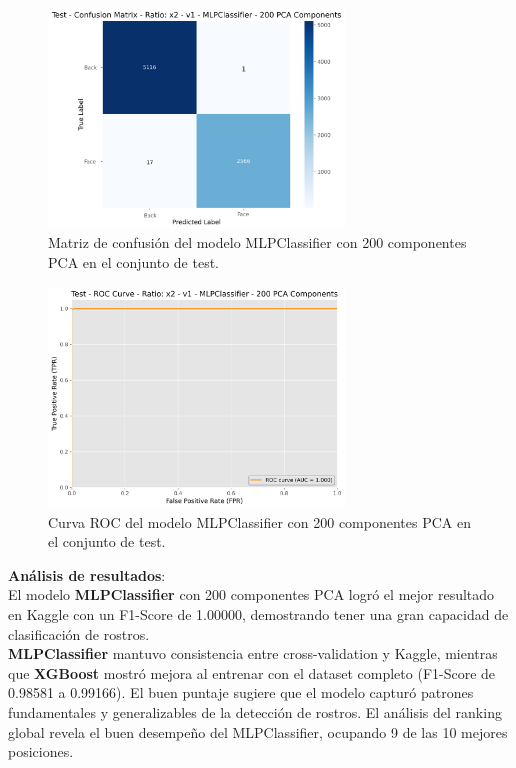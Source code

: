 \documentclass{article}
\begin{document}
\begin{figure}[H]
    \centering
    \includegraphics[width=0.7\textwidth]{tarea_5/imagenes/x2_v1_200_MLPClassifier_test_confusion_matrix.png}
    \caption{Matriz de confusión del modelo MLPClassifier con 200 componentes PCA en el conjunto de test.}
    \label{fig:confusion_matrix}
\end{figure}

\begin{figure}[H]
    \centering
    \includegraphics[width=0.7\textwidth]{tarea_5/imagenes/x2_v1_200_MLPClassifier_test_roc_curve.png}
    \caption{Curva ROC del modelo MLPClassifier con 200 componentes PCA en el conjunto de test.}
    \label{fig:roc_curve}
\end{figure}

\textbf{Análisis de resultados}:\\ 

El modelo \textbf{MLPClassifier} con 200 componentes PCA logró el mejor resultado en Kaggle con un F1-Score de 1.00000, demostrando tener una gran capacidad de clasificación de rostros.\\

\textbf{MLPClassifier} mantuvo consistencia entre cross-validation y Kaggle, mientras que \textbf{XGBoost} mostró mejora al entrenar con el dataset completo (F1-Score de 0.98581 a 0.99166). El buen puntaje sugiere que el modelo capturó patrones fundamentales y generalizables de la detección de rostros. El análisis del ranking global revela el buen desempeño del MLPClassifier, ocupando 9 de las 10 mejores posiciones.\\
\end{document}
